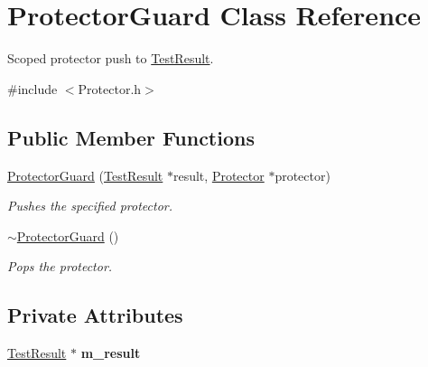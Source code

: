 \hypertarget{class_protector_guard}{}\section{Protector\+Guard Class Reference}
\label{class_protector_guard}


Scoped protector push to \hyperlink{class_test_result}{Test\+Result}.  




{\ttfamily \#include $<$Protector.\+h$>$}

\subsection*{Public Member Functions}
\begin{DoxyCompactItemize}
\item 
\hyperlink{class_protector_guard_abc4a3b2b51b6d93fb3dd9fed1bbc85db}{Protector\+Guard} (\hyperlink{class_test_result}{Test\+Result} $\ast$result, \hyperlink{class_protector}{Protector} $\ast$protector)\hypertarget{class_protector_guard_abc4a3b2b51b6d93fb3dd9fed1bbc85db}{}\label{class_protector_guard_abc4a3b2b51b6d93fb3dd9fed1bbc85db}

\begin{DoxyCompactList}\small\item\em Pushes the specified protector. \end{DoxyCompactList}\item 
\hyperlink{class_protector_guard_af80b574cc5999746e77ec13d2d0093f5}{$\sim$\+Protector\+Guard} ()\hypertarget{class_protector_guard_af80b574cc5999746e77ec13d2d0093f5}{}\label{class_protector_guard_af80b574cc5999746e77ec13d2d0093f5}

\begin{DoxyCompactList}\small\item\em Pops the protector. \end{DoxyCompactList}\end{DoxyCompactItemize}
\subsection*{Private Attributes}
\begin{DoxyCompactItemize}
\item 
\hyperlink{class_test_result}{Test\+Result} $\ast$ {\bfseries m\+\_\+result}\hypertarget{class_protector_guard_a48b818a30feca333dabc0dc7869d35ac}{}\label{class_protector_guard_a48b818a30feca333dabc0dc7869d35ac}

\end{DoxyCompactItemize}


